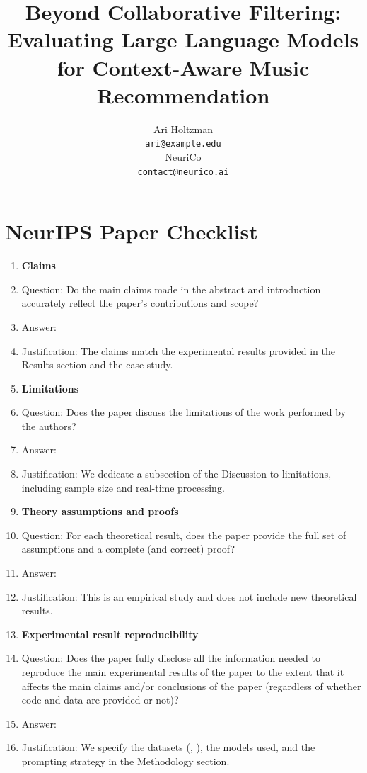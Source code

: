 \documentclass{article}
\title{Beyond Collaborative Filtering: Evaluating Large Language Models for Context-Aware Music Recommendation}
\author{
  Ari Holtzman \\
  \texttt{ari@example.edu} \\
  \And
  NeuriCo \\
  \texttt{contact@neurico.ai} \\
}
\begin{document}
\maketitle












\newpage
\section*{NeurIPS Paper Checklist}

\begin{enumerate}

\item {\bf Claims}
    \item[] Question: Do the main claims made in the abstract and introduction accurately reflect the paper's contributions and scope?
    \item[] Answer: \answerYes{}
    \item[] Justification: The claims match the experimental results provided in the Results section and the case study.

\item {\bf Limitations}
    \item[] Question: Does the paper discuss the limitations of the work performed by the authors?
    \item[] Answer: \answerYes{}
    \item[] Justification: We dedicate a subsection of the Discussion to limitations, including sample size and real-time processing.

\item {\bf Theory assumptions and proofs}
    \item[] Question: For each theoretical result, does the paper provide the full set of assumptions and a complete (and correct) proof?
    \item[] Answer: \answerNA{}
    \item[] Justification: This is an empirical study and does not include new theoretical results.

\item {\bf Experimental result reproducibility}
    \item[] Question: Does the paper fully disclose all the information needed to reproduce the main experimental results of the paper to the extent that it affects the main claims and/or conclusions of the paper (regardless of whether code and data are provided or not)?
    \item[] Answer: \answerYes{}
    \item[] Justification: We specify the datasets (\musicrs, \spotifydata), the models used, and the prompting strategy in the Methodology section.


\end{enumerate}
\end{document}

